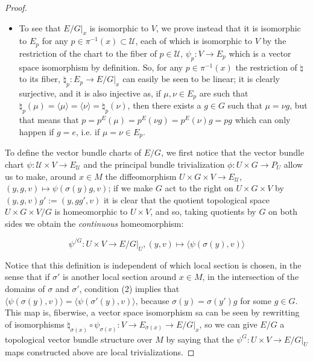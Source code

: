 \begin{proof}
\begin{itemize}
    \item To see that $E/G|_x$ is isomorphic to $V$, we prove instead that it is isomorphic to $E_p$ for any $p \in \pi^{-1}(x) \subset \mathcal U$, each of which is isomorphic to $V$ by the restriction of the chart to the fiber of $p \in \mathcal U$, $\psi_p: V \to E_p$ which is a vector space isomorphism by definition. So, for any $p \in \pi^{-1}(x)$ the restriction of $\natural$ to its fiber, $\natural_p:E_p \to E/G|_x$ can easily be seen to be linear; it is clearly surjective, and it is also injective as, if $\mu, \nu \in E_p$ are such that $\natural_p(\mu) = \langle\mu\rangle = \langle\nu\rangle = \natural_p(\nu)$, then there exists a $g \in G$ such that $\mu = \nu g$, but that means that $p = p^E(\mu) = p^E(\nu g) = p^E(\nu)g = pg$ which can only happen if $g = e$, i.e. if $\mu = \nu \in E_p$.
\end{itemize}

To define the vector bundle charts of $E/G$, we first notice that the vector bundle chart $\psi:\mathcal U \times V \to E_\mathcal U$ and the principal bundle trivialization $\phi: U \times G \to P_U$ allow us to make, around $x\in M$ the diffeomorphism $U \times G \times V \to E_\mathcal U$, $(y, g, v) \mapsto \psi(\sigma(y)g, v)$; if we make $G$ act to the right on $U \times G \times V$ by $(y, g, v)g' := (y, gg', v)$ it is clear that the quotient topological space $U \times G \times V / G$ is homeomorphic to $U \times V$, and so, taking quotients by $G$ on both sides we obtain the \emph{continuous} homeomorphism:

\[
    \psi^{/G}: U \times V \to E/G|_{U}, (y, v) \mapsto \langle \psi(\sigma(y), v) \rangle
\]

Notice that this definition is independent of which local section is chosen, in the sense that if $\sigma'$ is another local section around $x \in M$, in the intersection of the domains of $\sigma$ and $\sigma'$, condition (2) implies that $\langle \psi(\sigma(y), v) \rangle  = \langle \psi(\sigma'(y), v) \rangle$, because $\sigma(y) = \sigma(y')g$ for some $g \in G$. This map is, fiberwise, a vector space isomorphism sa can be seen by rewritting of isomorphisms $\natural_{\sigma(x)} \circ \psi_{\sigma(x)}: V \to E_{\sigma(x)} \to E/G|_x$, so we can give $E/G$ a topological vector bundle structure over $M$ by saying that the $\psi^G:U \times V \to E/G|_U$ maps constructed above are local trivializations.


\end{proof}
